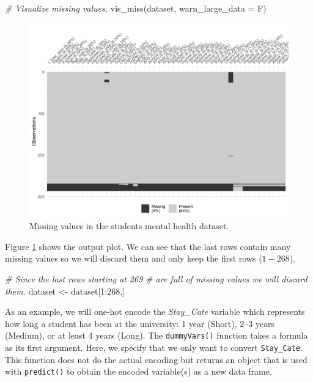 \documentclass[
  11pt,
]{krantz}
\newenvironment{Shaded}{\begin{snugshade}}{\end{snugshade}}
\newcommand{\AttributeTok}[1]{\textcolor[rgb]{0.61,0.61,0.61}{#1}}
\newcommand{\CommentTok}[1]{\textcolor[rgb]{0.37,0.37,0.37}{\textit{#1}}}
\newcommand{\DecValTok}[1]{\textcolor[rgb]{0.06,0.06,0.06}{#1}}
\newcommand{\FunctionTok}[1]{\textcolor[rgb]{0,0,0}{#1}}
\newcommand{\NormalTok}[1]{#1}
\newcommand{\OtherTok}[1]{\textcolor[rgb]{0.37,0.37,0.37}{#1}}
\newcommand{\SpecialCharTok}[1]{\textcolor[rgb]{0,0,0}{#1}}
\begin{document}
\begin{Shaded}
\begin{Highlighting}[]
\CommentTok{\# Visualize missing values.}
\FunctionTok{vis\_miss}\NormalTok{(dataset, }\AttributeTok{warn\_large\_data =}\NormalTok{ F)}
\end{Highlighting}
\end{Shaded}

\begin{figure}

{\centering \includegraphics[width=0.9\linewidth]{images/mentalmissing} 

}

\caption{Missing values in the students mental health dataset.}\label{fig:mentalmissing}
\end{figure}

Figure \ref{fig:mentalmissing} shows the output plot. We can see that the last rows contain many missing values so we will discard them and only keep the first rows (\(1-268\)).

\begin{Shaded}
\begin{Highlighting}[]
\CommentTok{\# Since the last rows starting at 269}
\CommentTok{\# are full of missing values we will discard them.}
\NormalTok{dataset }\OtherTok{\textless{}{-}}\NormalTok{ dataset[}\DecValTok{1}\SpecialCharTok{:}\DecValTok{268}\NormalTok{,]}
\end{Highlighting}
\end{Shaded}

As an example, we will one-hot encode the \emph{Stay\_Cate} variable which represents how long a student has been at the university: 1 year (Short), 2--3 years (Medium), or at least 4 years (Long). The \texttt{dummyVars()} function takes a formula as its first argument. Here, we specify that we only want to convert \texttt{Stay\_Cate}. This function does not do the actual encoding but returns an object that is used with \texttt{predict()} to obtain the encoded variable(s) as a new data frame.
\end{document}
